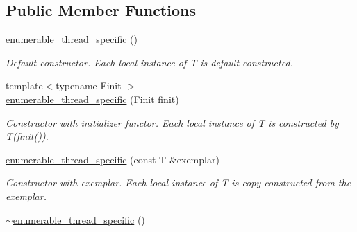 \subsection*{Public Member Functions}
\begin{DoxyCompactItemize}
\item 
\hypertarget{classtbb_1_1interface6_1_1enumerable__thread__specific_ad95ccef01367c0b6d75f6f91f5bf5315}{}\hyperlink{classtbb_1_1interface6_1_1enumerable__thread__specific_ad95ccef01367c0b6d75f6f91f5bf5315}{enumerable\+\_\+thread\+\_\+specific} ()\label{classtbb_1_1interface6_1_1enumerable__thread__specific_ad95ccef01367c0b6d75f6f91f5bf5315}

\begin{DoxyCompactList}\small\item\em Default constructor. Each local instance of T is default constructed. \end{DoxyCompactList}\item 
\hypertarget{classtbb_1_1interface6_1_1enumerable__thread__specific_a6c4bec58ae7f0f2b6c77f0baf79623ee}{}{\footnotesize template$<$typename Finit $>$ }\\\hyperlink{classtbb_1_1interface6_1_1enumerable__thread__specific_a6c4bec58ae7f0f2b6c77f0baf79623ee}{enumerable\+\_\+thread\+\_\+specific} (Finit finit)\label{classtbb_1_1interface6_1_1enumerable__thread__specific_a6c4bec58ae7f0f2b6c77f0baf79623ee}

\begin{DoxyCompactList}\small\item\em Constructor with initializer functor. Each local instance of T is constructed by T(finit()). \end{DoxyCompactList}\item 
\hypertarget{classtbb_1_1interface6_1_1enumerable__thread__specific_a6f0249ee95fa56665da4b6984f3a685a}{}\hyperlink{classtbb_1_1interface6_1_1enumerable__thread__specific_a6f0249ee95fa56665da4b6984f3a685a}{enumerable\+\_\+thread\+\_\+specific} (const T \&exemplar)\label{classtbb_1_1interface6_1_1enumerable__thread__specific_a6f0249ee95fa56665da4b6984f3a685a}

\begin{DoxyCompactList}\small\item\em Constructor with exemplar. Each local instance of T is copy-\/constructed from the exemplar. \end{DoxyCompactList}\item 
\hypertarget{classtbb_1_1interface6_1_1enumerable__thread__specific_a6ea8d717f770acb63efc406df52d4585}{}\hyperlink{classtbb_1_1interface6_1_1enumerable__thread__specific_a6ea8d717f770acb63efc406df52d4585}{$\sim$enumerable\+\_\+thread\+\_\+specific} ()\label{classtbb_1_1interface6_1_1enumerable__thread__specific_a6ea8d717f770acb63efc406df52d4585}


\end{DoxyCompactItemize}
